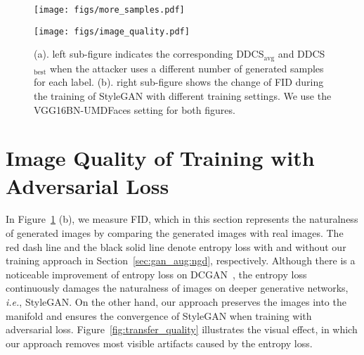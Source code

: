 \begin{figure}[htb]%
	\centering
	\begin{minipage}[t]{0.495\linewidth}
		\texttt{[image: figs/more\_samples.pdf]}
	\end{minipage}
	\begin{minipage}[t]{0.495\linewidth}
		\texttt{[image: figs/image\_quality.pdf]}
	\end{minipage}
	\caption{(a). left sub-figure indicates the corresponding DDCS$_\text{avg}$ and DDCS$_\text{best}$ when the attacker uses a different number of generated samples for each label. (b). right sub-figure shows the change of FID during the training of StyleGAN with different training settings. We use the VGG16BN-UMDFaces setting for both figures.}
	\label{exp:ms_iq}
\end{figure}

\section{Image Quality of Training with Adversarial Loss}
In Figure~\ref{exp:ms_iq} (b), we measure FID, which in this section represents the naturalness of generated images by comparing the generated images with real images. The red dash line and the black solid line denote entropy loss with and without our training approach in Section~\ref{sec:gan_aug:ngd}, respectively. Although there is a noticeable improvement of entropy loss on DCGAN~\cite{kedmi21iccv,rethink23cvpr}, the entropy loss continuously damages the naturalness of images on deeper generative networks, \emph{i.e.}, StyleGAN.
On the other hand, our approach preserves the images into the manifold and ensures the convergence of StyleGAN when training with adversarial loss.
Figure~\ref{fig:transfer_quality} illustrates the visual effect, in which our approach removes most visible artifacts caused by the entropy loss.

